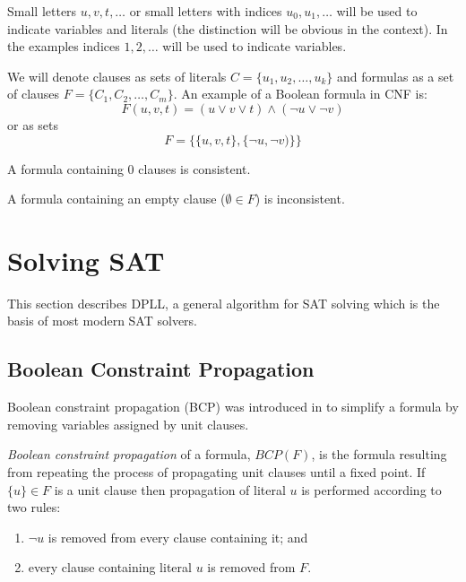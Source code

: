 Small letters $u, v, t, \ldots$ or small letters with indices $u_0,
u_1, \ldots$ will be used to indicate variables and literals (the
distinction will be obvious in the context). In the examples
indices $1, 2, \ldots$ will be used to indicate variables.

We will denote clauses as sets of literals $C = \{ u_1, u_2, \ldots,
u_k \}$ and formulas as a set of clauses $F = \{ C_1, C_2, \ldots,
C_m \} $.  An example of a Boolean formula in CNF is:
\[
F(u, v, t) = (u \lor v \lor t) \land (\neg u \lor \neg v)
\]
or as sets
\[
F = \{ \{u, v, t\}, \{\neg u, \neg v)\}\}
\]

\begin{myprop}
  A formula containing 0 clauses is consistent.
\end{myprop}

\begin{myprop}
  A formula containing an empty clause ($\emptyset \in F$) is inconsistent.
\end{myprop}


\section{Solving SAT}
\label{sec:solving-sat}

This section describes DPLL, a general algorithm for SAT solving
which is the basis of most modern SAT solvers.

\subsection{Boolean Constraint Propagation}
\label{ssec:bcp}

Boolean constraint propagation (BCP) was introduced in
\cite{Davis:1960:CPQ:321033.321034} to simplify a formula by removing
variables assigned by unit clauses.

\begin{mydef}
  \emph{Boolean constraint propagation} of a formula, $BCP(F)$, is
  the formula resulting from repeating the process of propagating
  unit clauses until a fixed point. If $\{ u \} \in F$ is a unit
  clause then propagation of literal
  $u$ is performed according to two rules:
  \begin{enumerate}
    \item $\neg u$ is removed from every clause containing it; and
    \item every clause containing literal $u$ is removed from $F$.
  \end{enumerate}
\end{mydef}

